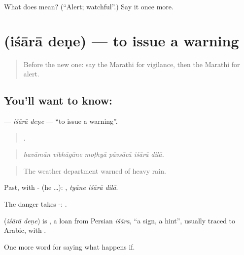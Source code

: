 \begin{tcolorbox}[breakable,colback=teal!4,colframe=teal!35!black,title={Before you move on}]
What does  mean? (\textquotedblleft{}Alert; watchful\textquotedblright{}.) Say it once more.
\end{tcolorbox}
\section[\texorpdfstring{\mr{इशारा} \mr{देणे} (iśārā deṇe)}{इशारा देणे (iśārā deṇe)}]{  (iśārā deṇe) — to issue a warning}

\label{lesson:MR-C541-isara-dene}



\begin{quote}
Before the new one: say the Marathi for vigilance, then the Marathi for alert.
\end{quote}

\subsection*{You'll want to know:  }
\textbf{ } — \emph{iśārā deṇe} — \textquotedblleft{}to issue a warning\textquotedblright{}.

\begin{quote}
     .
\end{quote}

\begin{quote}
\emph{havāmān vibhāgāne moṭhyā pāvsācā iśārā dilā.}
\end{quote}

\begin{quote}
The weather department warned of heavy rain.
\end{quote}

Past, with - (he …):   , \emph{tyāne iśārā dilā}.

The danger takes -:   .

\begin{cousinweb}
\textbf{ } (\emph{iśārā deṇe}) is , a loan from Persian \emph{išāra}, \textquotedblleft{}a sign, a hint\textquotedblright{}, usually traced to Arabic, with .
\end{cousinweb}

\begin{grammarlens}[title={What you've built}]
One more word for saying what happens if.
\end{grammarlens}

